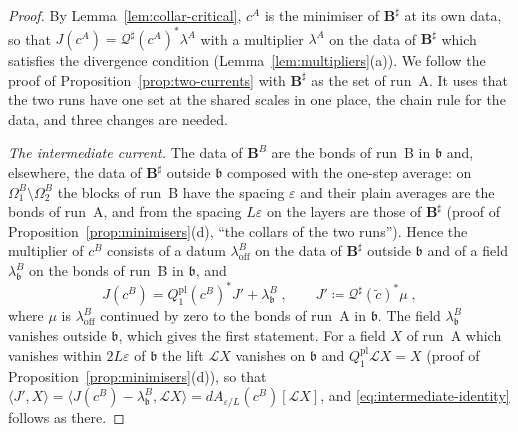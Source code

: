 \begin{proof}
By Lemma~\ref{lem:collar-critical}, $c^A$ is the minimiser of $\mathbf B^\sharp$ at its own data, so that $J(c^A) = \mathcal Q^\sharp(c^A)^*\lambda^A$ with a multiplier $\lambda^A$ on the data of $\mathbf B^\sharp$ which satisfies the divergence condition (Lemma~\ref{lem:multipliers}(a)). We follow the proof of Proposition~\ref{prop:two-currents} with $\mathbf B^\sharp$ as the set of run~A. It uses that the two runs have one set at the shared scales in one place, the chain rule for the data, and three changes are needed.

\emph{The intermediate current.} The data of $\mathbf B^B$ are the bonds of run~B in $\mathfrak b$ and, elsewhere, the data of $\mathbf B^\sharp$ outside $\mathfrak b$ composed with the one-step average: on $\Omega^B_1 \setminus \Omega^B_2$ the blocks of run~B have the spacing $\varepsilon$ and their plain averages are the bonds of run~A, and from the spacing $L\varepsilon$ on the layers are those of $\mathbf B^\sharp$ (proof of Proposition~\ref{prop:minimisers}(d), ``the collars of the two runs''). Hence the multiplier of $c^B$ consists of a datum $\lambda^B_{\mathrm{off}}$ on the data of $\mathbf B^\sharp$ outside $\mathfrak b$ and of a field $\lambda^B_{\mathfrak b}$ on the bonds of run~B in $\mathfrak b$, and
\[
    J(c^B) = Q^{\mathrm{pl}}_1(c^B)^*J' + \lambda^B_{\mathfrak b}\;,
    \qquad
    J' \coloneqq \mathcal Q^\sharp(\tilde c)^*\mu\;,
\]
where $\mu$ is $\lambda^B_{\mathrm{off}}$ continued by zero to the bonds of run~A in $\mathfrak b$. The field $\lambda^B_{\mathfrak b}$ vanishes outside $\mathfrak b$, which gives the first statement. For a field $X$ of run~A which vanishes within $2L\varepsilon$ of $\mathfrak b$ the lift $\mathcal LX$ vanishes on $\mathfrak b$ and $Q^{\mathrm{pl}}_1\mathcal LX = X$ (proof of Proposition~\ref{prop:minimisers}(d)), so that $\langle J', X\rangle = \langle J(c^B) - \lambda^B_{\mathfrak b}, \mathcal LX\rangle = dA_{\varepsilon/L}(c^B)[\mathcal LX]$, and \eqref{eq:intermediate-identity} follows as there.


\end{proof}
